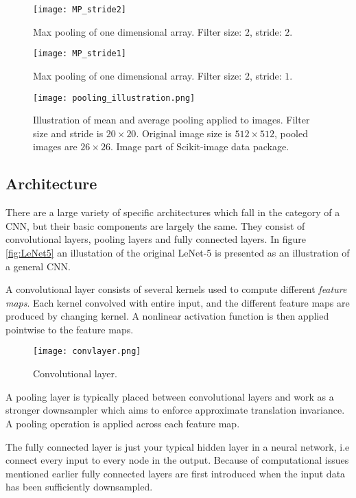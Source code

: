 \documentclass[../../thesis.tex]{subfiles}
\begin{document}
\begin{figure}[h]
    \texttt{[image: MP\_stride2]}
    \centering    
    \caption{Max pooling of one dimensional array. Filter size: $2$, stride: $2$.}
\end{figure}
\begin{figure}[h]
    \texttt{[image: MP\_stride1]}
    \centering    
    \caption{Max pooling of one dimensional array. Filter size: $2$, stride: $1$.}
\end{figure}

\begin{figure}[h]
    \centering
    \texttt{[image: pooling\_illustration.png]}
    \caption{Illustration of mean and average pooling applied to images. Filter size and stride is $20\times 20$. Original image size is $512\times 512$, pooled images are $26\times26$. Image part of Scikit-image data package.}
\end{figure}


\subsection{Architecture}
There are a large variety of specific architectures which fall in the category of a CNN, but their basic components are largely the same. They consist of convolutional layers, pooling layers and fully connected layers. In figure \ref{fig:LeNet5} an illustation of the original LeNet-5 \cite{LeCun1989ConvNet} is presented as an illustration of a general CNN.\newline

A convolutional layer consists of several kernels used to compute different \textit{feature maps}. Each kernel convolved with entire input, and the different feature maps are produced by changing kernel. A nonlinear activation function is then applied pointwise to the feature maps.
\begin{figure}[h]
    \centering
    \texttt{[image: convlayer.png]}
    \caption{Convolutional layer.}
\end{figure}
A pooling layer is typically placed between convolutional layers and work as a stronger downsampler which aims to enforce approximate translation invariance. A pooling operation is applied across each feature map.\newline

The fully connected layer is just your typical hidden layer in a neural network, i.e connect every input to every node in the output. Because of computational issues mentioned earlier fully connected layers are first introduced when the input data has been sufficiently downsampled.
\end{document}
